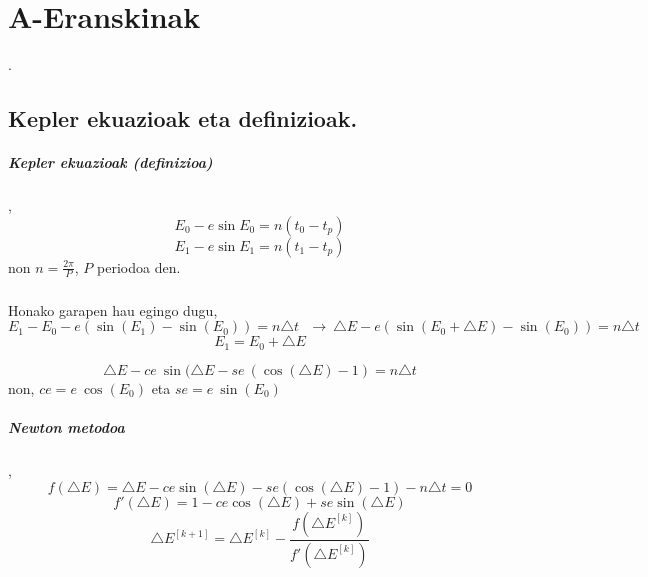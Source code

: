 \chapter{A-Eranskinak}.

\section{Kepler ekuazioak eta definizioak.}

\paragraph*{\textbf{Kepler ekuazioak (definizioa)}},
\begin{equation*}
E_0-e\sin E_0=n (t_0-t_p)
\end{equation*}
\begin{equation*}
E_1-e\sin E_1=n (t_1-t_p)
\end{equation*}
non $n=\frac{2\pi}{P}$, $P$ periodoa den.

\paragraph*{} Honako garapen hau egingo dugu,
\begin{equation*}
E_1-E_0-e(\sin(E_1)-\sin(E_0))=n \triangle t \ \ \ \longrightarrow \ \triangle E - e(\sin(E_0+\triangle E)-\sin(E_0))=n \triangle t
\end{equation*}
\begin{equation*}
E_1=E_0+\triangle E  
\end{equation*}

\begin{equation*}
\triangle E - ce \ \sin(\triangle E- se \ (\cos(\triangle E)-1)=n \triangle t
\end{equation*}
non, $ce=e \ \cos(E_0)$ eta $se=e \ \sin(E_0)$

\paragraph*{\textbf{Newton metodoa}},
\begin{equation*}
f(\triangle E)=\triangle E - ce \sin(\triangle E)- se (\cos(\triangle E)-1)-n \triangle t=0
\end{equation*}
\begin{equation*}
f'(\triangle E)=1-ce \cos(\triangle E)+ se \sin(\triangle E)
\end{equation*}
\begin{equation}
\triangle E^{[k+1]}=\triangle E^{[k]}- \frac{f(\triangle E^{[k]})}{f'(\triangle E^{[k]})}
\end{equation}

